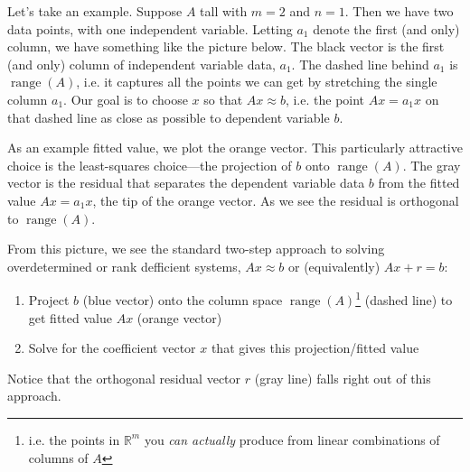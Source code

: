 \documentclass[12pt]{book}
\numberwithin{equation}{section} %
\theoremstyle{plain}
\theoremstyle{definition}
\theoremstyle{remark}
\newcommand{\Rm}{\mathbb{R}^m}
\newcommand{\range}{\operatorname{range}}
\begin{document}
Let's take an example. Suppose $A$ tall with $m=2$ and $n=1$. Then we
have two data points, with one independent variable. Letting $a_1$
denote the first (and only) column, we have something like the picture
below.  The black vector is the first (and only) column of independent
variable data, $a_1$. The dashed line behind $a_1$ is $\range(A)$, i.e.
it captures all the points we can get by stretching the single column
$a_1$. Our goal is to choose $x$ so that $Ax\approx b$, i.e. the point
$Ax=a_1x$ on that dashed line as close as possible to dependent
variable $b$.

As an example fitted value, we plot the orange vector.
This particularly attractive choice is the least-squares choice---the
projection of $b$ onto $\range(A)$. The gray vector is the residual that
separates the dependent variable data $b$ from the fitted value
$Ax=a_1x$, the tip of the orange vector. As we see the
residual is orthogonal to $\range(A)$.

\begin{figure}[htbp!]
\centering
{}
\end{figure}

From this picture, we see the standard two-step approach
to solving overdetermined or rank defficient systems,
$Ax\approx b$ or (equivalently) $Ax+r=b$:
\begin{enumerate}[label=(\roman*)]
  \item Project $b$ (blue vector) onto the column space
    $\range(A)$\footnote{%
        i.e. the points in $\Rm$ you \emph{can actually} produce from
        linear combinations of columns of $A$
    }
    (dashed line) to get fitted value $Ax$ (orange vector)
  \item Solve for the coefficient vector $x$ that gives this
    projection/fitted value
\end{enumerate}
Notice that the orthogonal residual vector $r$ (gray line) falls right
out of this approach.
\end{document}
